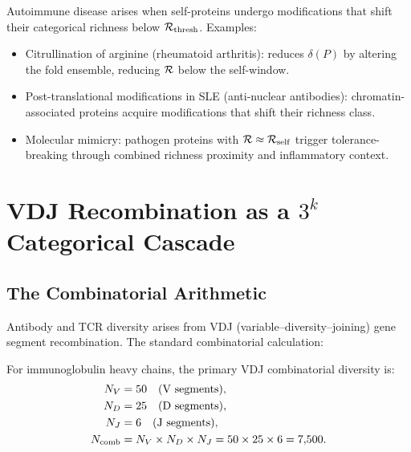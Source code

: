 \begin{corollary}
\label{cor:autoimmunity}
Autoimmune disease arises when self-proteins undergo modifications that shift
their categorical richness below $\mathcal{R}_{\mathrm{thresh}}$. Examples:
\begin{itemize}
  \item Citrullination of arginine (rheumatoid arthritis): reduces $\delta(P)$
        by altering the fold ensemble, reducing $\mathcal{R}$ below the self-window.
  \item Post-translational modifications in SLE (anti-nuclear antibodies):
        chromatin-associated proteins acquire modifications that shift their
        richness class.
  \item Molecular mimicry: pathogen proteins with $\mathcal{R} \approx \mathcal{R}_{\mathrm{self}}$
        trigger tolerance-breaking through combined richness proximity and
        inflammatory context.
\end{itemize}
\end{corollary}

\section{VDJ Recombination as a $3^k$ Categorical Cascade}
\label{sec:vdj_recombination}

\subsection{The Combinatorial Arithmetic}

Antibody and TCR diversity arises from VDJ (variable--diversity--joining) gene
segment recombination. The standard combinatorial calculation:

\begin{proposition}
\label{prop:vdj_primary}
For immunoglobulin heavy chains, the primary VDJ combinatorial diversity is:
\begin{align}
  N_V &= 50 \quad \text{(V segments)}, \notag \\
  N_D &= 25 \quad \text{(D segments)}, \notag \\
  N_J &= 6  \quad \text{(J segments)}, \notag \\
  N_{\mathrm{comb}} &= N_V \times N_D \times N_J = 50 \times 25 \times 6 = 7{,}500.
\end{align}
\end{proposition}

